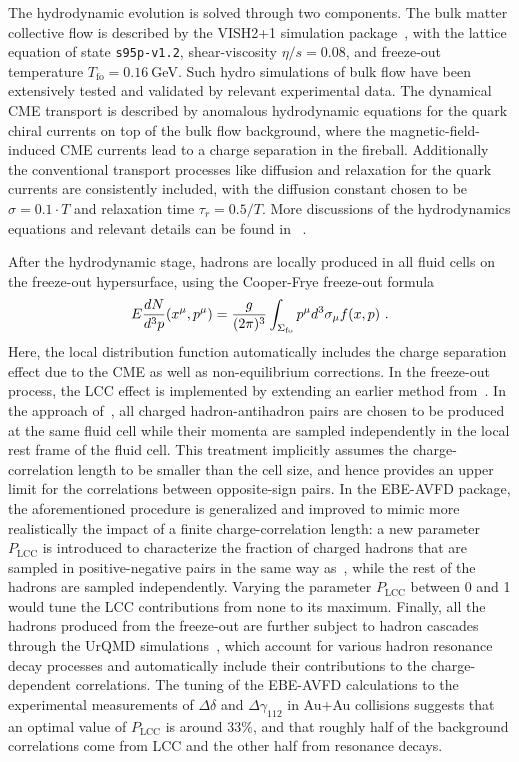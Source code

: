 The hydrodynamic evolution is solved through two components. The bulk matter collective flow is described by the VISH2+1 simulation package~\cite{Shen:2014vra}, with the lattice equation of state \texttt{s95p-v1.2}, shear-viscosity $\eta/s=0.08$, and freeze-out temperature $T_\text{fo}=0.16~$GeV. Such hydro simulations of bulk flow have been extensively tested and validated by relevant experimental data. The dynamical CME transport is described by anomalous hydrodynamic equations for the quark chiral currents on top of the bulk flow background, where the magnetic-field-induced CME currents lead to a charge separation in the fireball.   Additionally the conventional transport processes like diffusion and relaxation for the quark currents are consistently included, with the diffusion constant  chosen to be $\sigma=0.1\cdot T$ and relaxation time $\tau_r = 0.5/T$. More discussions of the hydrodynamics equations and relevant details can be found in ~\cite{Shi:2017cpu,Jiang:2016wve,Shi:2019wzi}. 

After the hydrodynamic stage, hadrons are locally produced in all fluid cells on the freeze-out hypersurface, using the Cooper-Frye freeze-out formula 
\begin{eqnarray}\label{eq_cooperfrye}
E \frac{dN}{d^3p} (x^\mu, p^\mu) = \frac{g}{(2\pi)^3} \int_{\Sigma_{\rm fo}} p^\mu d^3\sigma_\mu f(x,p) \,\, .
\end{eqnarray} 
Here, the local distribution function automatically  includes the charge separation effect due to the CME as well as  non-equilibrium corrections. 
In the freeze-out process, the LCC effect is implemented by extending an earlier method from~\cite{Schenke:2019ruo}. In the approach of~\cite{Schenke:2019ruo},  all charged hadron-antihadron pairs are chosen to be produced at the same fluid cell while their momenta are sampled independently in the local rest frame of the fluid cell. This treatment implicitly assumes the charge-correlation length to be smaller than the cell size, and hence provides an upper limit for the correlations between opposite-sign pairs. In the EBE-AVFD package, the aforementioned procedure is generalized and improved to mimic more realistically the impact of a finite charge-correlation length:   a new parameter $P_\text{LCC}$ is introduced to characterize the fraction of charged hadrons that are sampled in positive-negative pairs in the same way as~\cite{Schenke:2019ruo}, while the rest of the hadrons are sampled independently. Varying the parameter $P_\text{LCC}$ between 0 and 1 would tune the LCC contributions from none to its maximum. 
Finally, all the hadrons produced from the freeze-out are further subject to hadron cascades through the UrQMD simulations~\cite{Bleicher:1999xi}, which  account for various hadron resonance decay processes and automatically include their contributions to the charge-dependent correlations. The tuning of the EBE-AVFD calculations to the experimental measurements of $\Delta\delta$  and $\Delta\gamma_{112}$ in Au+Au collisions suggests that an optimal value of   $P_\text{LCC}$ is around   $33\%$, and that roughly half of the background correlations come  from LCC and the other half from resonance decays. 


